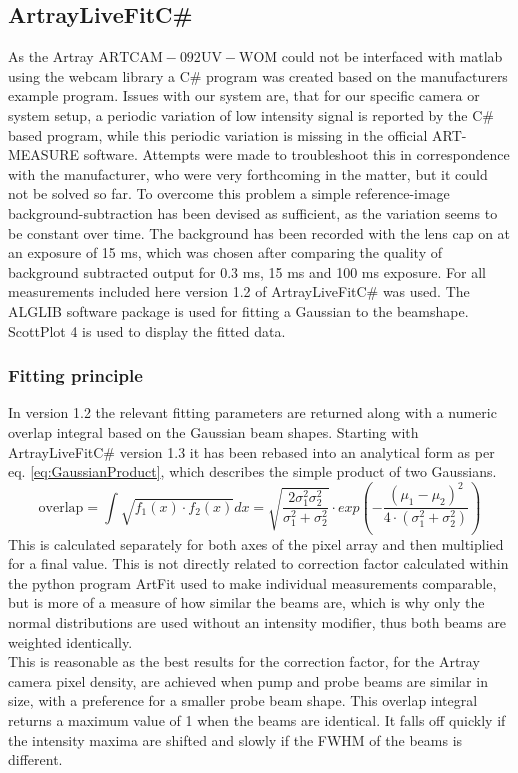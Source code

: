\documentclass[twoside,openright,listof=numbered]{scrreprt}
\begin{document}
\subsection{ArtrayLiveFitC\#}\label{sec:LiveFitting}
As the Artray $\mathrm{ARTCAM-092UV-WOM}$ could not be interfaced with matlab using the webcam library a C\# program was created based on the manufacturers example program.\cite{Artray2018}
Issues with our system are, that for our specific camera or system setup, a periodic variation of low intensity signal is reported by the C\# based program, while this periodic variation is missing in the official ART-MEASURE software. Attempts were made to troubleshoot this in correspondence with the manufacturer, who were very forthcoming in the matter, but it could not be solved so far. To overcome this problem a simple reference-image background-subtraction has been devised as sufficient, as the variation seems to be constant over time. The background has been recorded with the lens cap on at an exposure of 15 ms, which was chosen after comparing the quality of background subtracted output for 0.3 ms, 15 ms and 100 ms exposure. 
\newline
For all measurements included here version 1.2 of ArtrayLiveFitC\# was used. The ALGLIB\cite{Bochkanov2024} software package is used for fitting a Gaussian to the beamshape. ScottPlot 4\cite{ScottPlot4} is used to display the fitted data.\\
\subsubsection{Fitting principle}
In version 1.2 the relevant fitting parameters are returned along with a numeric overlap integral based on the Gaussian beam shapes. Starting with ArtrayLiveFitC\# version 1.3 it has been rebased into an analytical form as per eq. \ref{eq:GaussianProduct}, which describes the simple product of two Gaussians.
\begin{equation}
\mathrm{overlap} = \int \sqrt{f_1(x)\cdot f_2(x)}dx =  \sqrt{\frac{2 \sigma_1^2\sigma_2^2}{\sigma_1^2+\sigma_2^2}}\cdot exp\left(-\frac{\left(\mu_1-\mu_2\right)^2}{4\cdot \left(\sigma_1^2 + \sigma_2^2\right)}\right)\label{eq:GaussianProdcut}
\end{equation}
This is calculated separately for both axes of the pixel array and then multiplied for a final value. 
This is not directly related to correction factor calculated within the python program ArtFit used to make individual measurements comparable, but is more of a measure of how similar the beams are, which is why only the normal distributions are used without an intensity modifier, thus both beams are weighted identically. \\
This is reasonable as the best results for the correction factor, for the Artray camera pixel density, are achieved when pump and probe beams are similar in size, with a preference for a smaller probe beam shape. This overlap integral returns a maximum value of 1 when the beams are identical. It falls off quickly if the intensity maxima are shifted and slowly if the FWHM of the beams is different.\\
\end{document}

